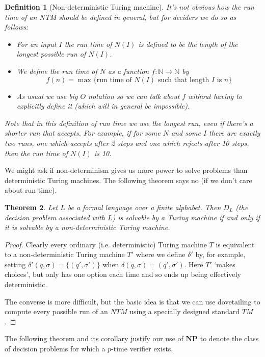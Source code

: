 \documentclass{article}
\theoremstyle{plain}
\newtheorem{theorem}{Theorem}[section]{\bfseries}{\itshape}
\newtheorem{definition}[theorem]{Definition}{\bfseries}{\upshape}
\theoremstyle{definition}
\newcommand{\NP}{\mathbf{NP}}
\begin{document}
\begin{definition}[Non-deterministic Turing machine]
It's not obvious how the run time of an NTM should be defined in general, but for deciders we do so as follows: 

\begin{itemize}
\item For an input $I$ the run time of $N(I)$ is defined to be the length of the longest possible run of $N(I)$. 
\item We define the run time of $N$ as a function $f:\mathbb{N}\to \mathbb{N}$ by 
\[f(n)=\max\{ \text{run time of }N(I) \text{ such that length }I \text{ is }n\}\]
\item As usual we use big $O$ notation so we can talk about $f$ without having to explicitly define it (which will in general be impossible).
\end{itemize}
Note that in this definition of run time we use the longest run, even if there's a shorter run that accepts. For example, if for some $N$ and some $I$ there are exactly two runs, one which accepts after 2 steps and one which rejects after 10 steps, then the run time of $N(I)$ is 10. 
\end{definition}

We might ask if non-determinism gives us more power to solve problems than deterministic Turing machines. The following theorem says no (if we don't care about run time).

\begin{theorem}
Let $L$ be a formal language over a finite alphabet. Then $D_L$ (the decision problem associated with $L$) is solvable by a Turing machine if and only if it is solvable by a non-deterministic Turing machine. 
\end{theorem}
\begin{proof}
Clearly every ordinary (i.e. deterministic) Turing machine $T$ is equivalent to a non-deterministic Turing machine $T'$ where we define $\delta'$ by, for example, setting $\delta'(q,\sigma)=\{(q',\sigma')\}$ when $\delta(q,\sigma)=(q',\sigma')$. Here $T'$ `makes choices', but only has one option each time and so ends up being effectively deterministic.

The converse is more difficult, but the basic idea is that we can use dovetailing to compute every possible run of an $NTM$ using a specially designed standard $TM$.
\end{proof}

The following theorem and its corollary justify our use of $\NP$ to denote the class of decision problems for which a $p$-time verifier exists.
\end{document}
